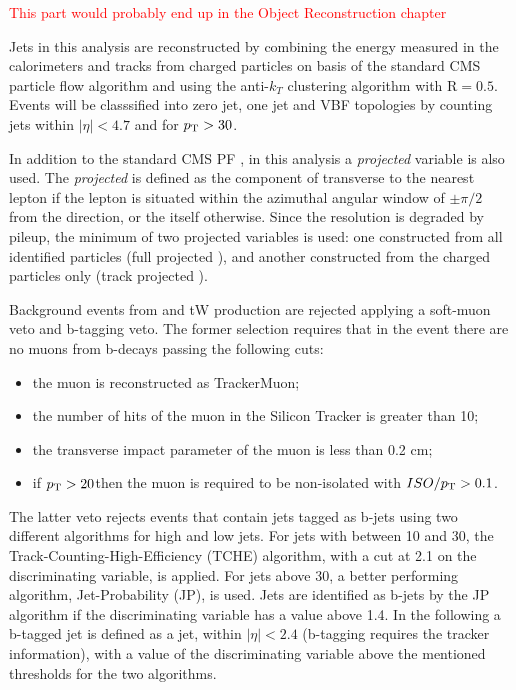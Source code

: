 \textcolor{red}{This part would probably end up in the Object Reconstruction chapter}

Jets in this analysis are reconstructed by combining the energy measured in the calorimeters and tracks from charged particles on basis of the standard CMS particle flow algorithm and using the anti-$k_T$ clustering algorithm with $\mathrm{R} = 0.5$. Events will be classsified into zero jet, one jet and VBF topologies by counting jets within $|\eta| < 4.7$ and for $p_\mathrm{T} > 30$\GeV.

In addition to the standard CMS PF \MET, in this analysis a \textit{projected} \MET variable is also used. The \textit{projected} \MET is defined as the component of \ptmiss transverse to the nearest lepton if the lepton is situated within the azimuthal angular window of $\pm \pi/2$ from the \ptmiss direction, or the \MET itself otherwise.
Since the \MET resolution is degraded by pileup, the minimum of two projected \MET variables is used: one constructed from all identified particles (full projected \MET), and another constructed from the charged particles only (track projected \MET).

Background events from \ttbar and tW production are rejected applying a soft-muon veto and b-tagging veto. The former selection requires that in the event there are no muons from b-decays passing the following cuts: 
\begin{itemize}
\item the muon is reconstructed as TrackerMuon;
\item the number of hits of the muon in the Silicon Tracker is greater than 10;
\item the transverse impact parameter of the muon is less than 0.2 cm;
\item if $p_\mathrm{T} > 20$\GeV then the muon is required to be non-isolated with $ISO/p_\mathrm{T} > 0.1$.
\end{itemize}

The latter veto rejects events that contain jets tagged as b-jets using two different algorithms for high and low \pt jets. For jets with \pt between 10 and 30\GeV, the Track-Counting-High-Efficiency (TCHE) algorithm, with a cut at 2.1 on the discriminating variable, is applied.
For jets above 30\GeV, a better performing algorithm, Jet-Probability (JP), is used. Jets are identified as b-jets by the JP algorithm if the discriminating variable has a value above 1.4.
In the following a b-tagged jet is defined as a jet, within $|\eta|<2.4$ (b-tagging requires the tracker information), with a value of the discriminating variable above the mentioned thresholds for the two algorithms.  


